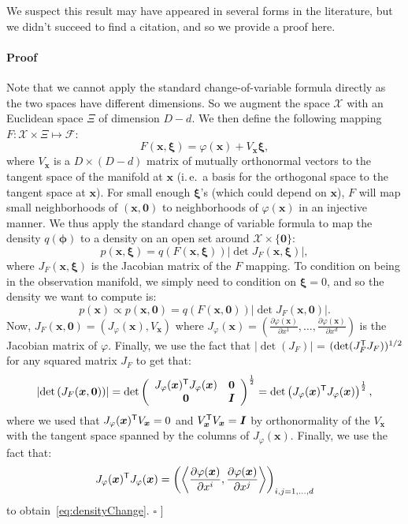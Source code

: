 \documentclass[twoside]{article}
\newcommand{\transpose}[1]{#1^{\mbox{\sf \scriptsize T}}}
\newcommand{\ie}{i.\,e.\ }
\begin{document}
We suspect this result may have appeared in several forms in the literature, but we didn't succeed to find a citation, and so we provide a proof here.

\paragraph{Proof} Note that we cannot apply the standard change-of-variable formula directly as the two spaces have different dimensions. So we augment the space $\mathcal{X}$ with an Euclidean space $\Xi$ of dimension $D-d$. We then define the following mapping $F:\mathcal{X}\times\Xi \mapsto \mathcal{F}$:
$$
F(\bm{x},\bm{\xi}) = \varphi(\bm{x}) + V_{\bm{x}} \bm{\xi},
$$
where $V_{\bm{x}}$ is a $D\times(D-d)$ matrix of mutually orthonormal vectors to the tangent space of the manifold at $\bm{x}$ (\ie a basis for the orthogonal space to the tangent space at $\bm{x}$). For small enough $\bm{\xi}$'s (which could depend on $\bm{x}$), $F$ will map small neighborhoods of $(\bm{x},\bm{0})$ to neighborhoods of $\varphi(\bm{x})$ in an injective manner. We thus apply the standard change of variable formula to map the density $q(\bm{\phi})$ to a density on an open set around $\mathcal{X}\times\{\bm{0}\}$:
$$
    p(\bm{x},\bm{\xi}) = q(F(\bm{x},\bm{\xi})) \left\vert\det J_F(\bm{x},\bm{\xi}) \right\vert ,
$$
where $J_F(\bm{x},\bm{\xi})$ is the Jacobian matrix of the $F$ mapping. To condition on being in the observation manifold, we simply need to condition on $\bm{\xi}=0$, and so the density we want to compute is:
$$
    p(\bm{x}) \propto p(\bm{x},\bm{0}) = q(F(\bm{x},\bm{0})) \left\vert\det J_F(\bm{x},\bm{0}) \right\vert .
$$
Now, $J_F(\bm{x},\bm{0})=(J_\varphi(\bm{x}), V_{\bm{x}})$ where $J_\varphi(\bm{x})=(\frac{\partial\varphi(\bm{x})}{\partial x^1}, \ldots, \frac{\partial\varphi(\bm{x})}{\partial x^d})$ is the Jacobian matrix of $\varphi$. Finally, we use the fact that $\vert\det(J_F)\vert$ = $(\det(\transpose{J_F} J_F))^{1/2}$ for any squared matrix $J_F$ to get that:
$$
\left\vert\det\left(J_F (\bm{x},\bm{0})\right)\right\vert = \det\left(\begin{array}{cc}
                        \transpose{J_\varphi(\bm{x})}J_\varphi(\bm{x}) & \bm{0} \\
                        \bm{0} & \bm{I}
                      \end{array} \right)^{\frac{1}{2}} = \det\left( \transpose{J_\varphi(\bm{x})}J_\varphi(\bm{x}) \right)^{\frac{1}{2}},
$$
where we used that $\transpose{J_\varphi(\bm{x})} V_{\bm{x}}=0$ and $\transpose{V_{\bm{x}}} V_{\bm{x}}=\bm{I}$ by orthonormality of the $V_{\bm{x}}$ with the tangent space spanned by the columns of $J_\varphi(\bm{x})$. Finally, we use the fact that:
$$
 \transpose{J_\varphi(\bm{x})}J_\varphi(\bm{x}) = \left( \left\langle\frac{\partial\varphi(\bm{x})}{\partial x^i} ,  \frac{\partial\varphi(\bm{x})}{\partial x^j}\right\rangle \right)_{i,j=1,\ldots, d}
$$
to obtain~\eqref{eq:densityChange}. $\square$
]
\end{document}
